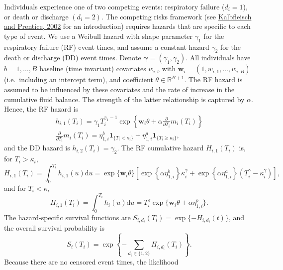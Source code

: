 \documentclass[
  10pt,
  a4paper,
]{article}
\begin{document}
Individuals experience one of two competing events: respiratory failure
(\(d_{i} = 1\)), or death or discharge \((d_{i} = 2)\). The competing
risks framework (see
\protect\hyperlink{ref-kalbfleisch_statistical_2002}{Kalbfleisch and
Prentice, 2002} for an introduction) requires hazards that are specific
to each type of event. We use a Weibull hazard with shape parameter
\(\gamma_{1}\) for the respiratory failure (RF) event times, and assume
a constant hazard \(\gamma_{2}\) for the death or discharge (DD) event
times. Denote \(\boldsymbol{\gamma} = (\gamma_{1}, \gamma_{2})\). All
individuals have \(b = 1, \ldots, B\) baseline (time invariant)
covariates \(w_{i, b}\) with
\(\boldsymbol{w}_{i} = (1, w_{i, 1}, \ldots, w_{i, B})\)(i.e.~including
an intercept term), and coefficient \(\theta \in \mathbb{R}^{B + 1}\).
The RF hazard is assumed to be influenced by these covariates and the
rate of increase in the cumulative fluid balance. The strength of the
latter relationship is captured by \(\alpha\). Hence, the RF hazard is
\begin{gather}
  h_{i, 1}(T_{i}) = \gamma_{1} T_{i}^{\gamma_{1} - 1} \exp\left\{\boldsymbol{w}_{i}\theta + \alpha \frac{\partial}{\partial T_{i}} m_{i}(T_{i})\right\} \\
  \frac{\partial}{\partial T_{i}} m_{i}(T_{i}) = \eta^{b}_{1, i}\boldsymbol{1}_{\{T_{i} < \kappa_{i}\}} + \eta^{a}_{1, i}\boldsymbol{1}_{\{T_{i} \geq \kappa_{i}\}},
\end{gather} and the DD hazard is \(h_{i, 2}(T_{i}) = \gamma_{2}\). The
RF cumulative hazard \(H_{i, 1}(T_{i})\) is, for \(T_{i} > \kappa_{i}\),
\begin{equation}
  H_{i, 1}(T_{i})
  = \int_{0}^{T_{i}} h_{i, 1}(u) \text{d}u
  = \exp\{\boldsymbol{w}_{i}\theta\}
    \left[
      \exp\left\{
        \alpha \eta^{b}_{1, i}
      \right\}
      \kappa_{i}^{\gamma}
      +
      \exp\left\{
        \alpha \eta^{a}_{1, i}
      \right\}
      (T_{i}^{\gamma} - \kappa_{i}^{\gamma})
    \right],
\end{equation} and for \(T_{i} < \kappa_{i}\) \begin{equation}
  H_{i, 1}(T_{i})
  = \int_{0}^{T_{i}} h_{i}(u) \text{d}u
  = T_{i}^{\gamma} \exp\{\boldsymbol{w}_{i}\theta + \alpha \eta^{b}_{1, i}\}.
\end{equation} The hazard-specific survival functions are
\(S_{i, d_{i}}(T_{i}) = \exp\{-H_{i, d_{i}}(t)\}\), and the overall
survival probability is \begin{equation}
  S_{i}(T_{i}) = \exp\left\{-\sum_{d_{i} \in \{1, 2\}} H_{i, d_{i}}(T_{i})\right\}.
\end{equation} Because there are no censored event times, the likelihood
\end{document}

